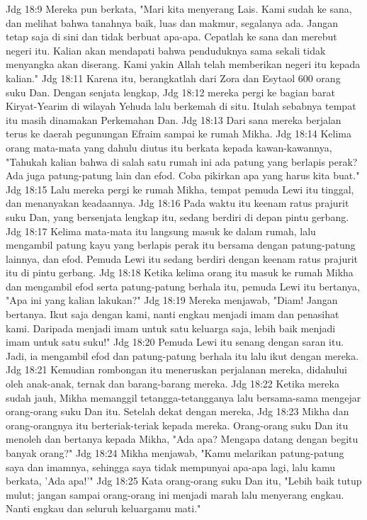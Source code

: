 Jdg 18:9  Mereka pun berkata, "Mari kita menyerang Lais. Kami sudah ke sana, dan melihat bahwa tanahnya baik, luas dan makmur, segalanya ada. Jangan tetap saja di sini dan tidak berbuat apa-apa. Cepatlah ke sana dan merebut negeri itu. Kalian akan mendapati bahwa penduduknya sama sekali tidak menyangka akan diserang. Kami yakin Allah telah memberikan negeri itu kepada kalian."
Jdg 18:11  Karena itu, berangkatlah dari Zora dan Esytaol 600 orang suku Dan. Dengan senjata lengkap,
Jdg 18:12  mereka pergi ke bagian barat Kiryat-Yearim di wilayah Yehuda lalu berkemah di situ. Itulah sebabnya tempat itu masih dinamakan Perkemahan Dan.
Jdg 18:13  Dari sana mereka berjalan terus ke daerah pegunungan Efraim sampai ke rumah Mikha.
Jdg 18:14  Kelima orang mata-mata yang dahulu diutus itu berkata kepada kawan-kawannya, "Tahukah kalian bahwa di salah satu rumah ini ada patung yang berlapis perak? Ada juga patung-patung lain dan efod. Coba pikirkan apa yang harus kita buat."
Jdg 18:15  Lalu mereka pergi ke rumah Mikha, tempat pemuda Lewi itu tinggal, dan menanyakan keadaannya.
Jdg 18:16  Pada waktu itu keenam ratus prajurit suku Dan, yang bersenjata lengkap itu, sedang berdiri di depan pintu gerbang.
Jdg 18:17  Kelima mata-mata itu langsung masuk ke dalam rumah, lalu mengambil patung kayu yang berlapis perak itu bersama dengan patung-patung lainnya, dan efod. Pemuda Lewi itu sedang berdiri dengan keenam ratus prajurit itu di pintu gerbang.
Jdg 18:18  Ketika kelima orang itu masuk ke rumah Mikha dan mengambil efod serta patung-patung berhala itu, pemuda Lewi itu bertanya, "Apa ini yang kalian lakukan?"
Jdg 18:19  Mereka menjawab, "Diam! Jangan bertanya. Ikut saja dengan kami, nanti engkau menjadi imam dan penasihat kami. Daripada menjadi imam untuk satu keluarga saja, lebih baik menjadi imam untuk satu suku!"
Jdg 18:20  Pemuda Lewi itu senang dengan saran itu. Jadi, ia mengambil efod dan patung-patung berhala itu lalu ikut dengan mereka.
Jdg 18:21  Kemudian rombongan itu meneruskan perjalanan mereka, didahului oleh anak-anak, ternak dan barang-barang mereka.
Jdg 18:22  Ketika mereka sudah jauh, Mikha memanggil tetangga-tetangganya lalu bersama-sama mengejar orang-orang suku Dan itu. Setelah dekat dengan mereka,
Jdg 18:23  Mikha dan orang-orangnya itu berteriak-teriak kepada mereka. Orang-orang suku Dan itu menoleh dan bertanya kepada Mikha, "Ada apa? Mengapa datang dengan begitu banyak orang?"
Jdg 18:24  Mikha menjawab, "Kamu melarikan patung-patung saya dan imamnya, sehingga saya tidak mempunyai apa-apa lagi, lalu kamu berkata, 'Ada apa!'"
Jdg 18:25  Kata orang-orang suku Dan itu, "Lebih baik tutup mulut; jangan sampai orang-orang ini menjadi marah lalu menyerang engkau. Nanti engkau dan seluruh keluargamu mati."
